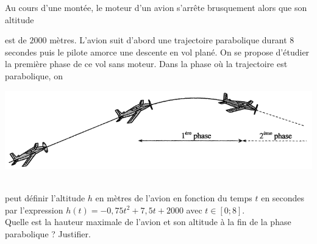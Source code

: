 \documentclass[11pt]{article}
\begin{document}
\begin{exo}
Au cours d'une montée, le moteur d’un avion s’arrête
brusquement alors que son altitude\\[1mm]
\begin{minipage}[]{.5\textwidth}
est de $2000$ mètres. L’avion suit d’abord une
trajectoire parabolique durant 8 secondes puis le pilote amorce une descente en
vol plané. On se propose d’étudier la première phase de ce vol sans moteur. Dans
la phase où la trajectoire est parabolique, on
\end{minipage}
\begin{minipage}{.5\textwidth}
  \begin{center}
\includegraphics[scale=.3]{avion.png}
  \end{center}
\end{minipage}\\[1mm]
peut définir l'altitude $h$ en mètres de l'avion en fonction du temps $t$ en
secondes par l'expression $h(t) = -0,75t^2+7,5t+2000$ avec $t\in[0;8]$.\\Quelle
est la hauteur maximale de l'avion et son altitude à la fin de la phase
parabolique ? Justifier.
\end{exo}
\end{document}
